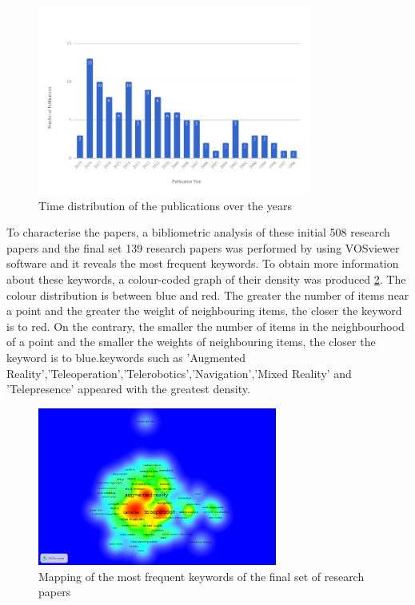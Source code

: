 \begin{figure}[h]
    \centering
    \includegraphics[width=0.8\textwidth]{images/Count_of_publication_Year.png}
    \caption{Time distribution of the publications over the years}
    \label{fig:distribution}
\end{figure}

To characterise the papers, a bibliometric analysis of these initial 508 research papers and the final set 139 research papers was performed by using VOSviewer software and it reveals the most frequent keywords. To obtain more information about these keywords, a colour-coded graph of their density was produced \ref{fig:final Density}. The colour distribution is between blue and red. The greater the number of items near a point and the greater the weight of neighbouring items, the closer the keyword is to red. On the contrary, the smaller the number of items in the neighbourhood of a point and the smaller the weights of neighbouring items, the closer the keyword is to blue.keywords such as 'Augmented Reality','Teleoperation','Telerobotics','Navigation','Mixed Reality' and 'Telepresence' appeared with the greatest density.

\begin{figure}[h]
    \centering
    \includegraphics[width=0.7\textwidth]{images/Density_3.png}
    \caption{Mapping of the most frequent keywords of the final set of research papers}
    \label{fig:final Density}
\end{figure}


